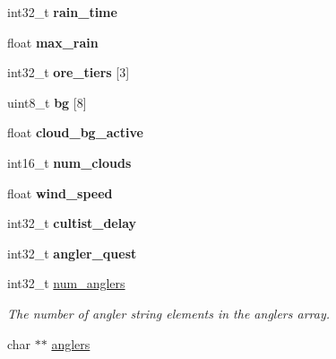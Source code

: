 \begin{DoxyCompactItemize}
\item 
\hypertarget{structworld_abf5197fc16933a702ef5f93432dfee52}{}int32\+\_\+t {\bfseries rain\+\_\+time}\label{structworld_abf5197fc16933a702ef5f93432dfee52}

\item 
\hypertarget{structworld_a7b007e79302363a07a14e06af7a60214}{}float {\bfseries max\+\_\+rain}\label{structworld_a7b007e79302363a07a14e06af7a60214}

\item 
\hypertarget{structworld_a496df8ba461d79de3c5f1aabd089844a}{}int32\+\_\+t {\bfseries ore\+\_\+tiers} \mbox{[}3\mbox{]}\label{structworld_a496df8ba461d79de3c5f1aabd089844a}

\item 
\hypertarget{structworld_a464553c413709cbf6936a36a3452199f}{}uint8\+\_\+t {\bfseries bg} \mbox{[}8\mbox{]}\label{structworld_a464553c413709cbf6936a36a3452199f}

\item 
\hypertarget{structworld_a028e822e40eb84c09d9afabb98de4007}{}float {\bfseries cloud\+\_\+bg\+\_\+active}\label{structworld_a028e822e40eb84c09d9afabb98de4007}

\item 
\hypertarget{structworld_ab53fb29e9273dcd4a3150811a5d43767}{}int16\+\_\+t {\bfseries num\+\_\+clouds}\label{structworld_ab53fb29e9273dcd4a3150811a5d43767}

\item 
\hypertarget{structworld_a5f1b61cb4b6baadfcc80ec0423be8f08}{}float {\bfseries wind\+\_\+speed}\label{structworld_a5f1b61cb4b6baadfcc80ec0423be8f08}

\item 
\hypertarget{structworld_aa33ce2ce0954ae1aff6cb887103db2ac}{}int32\+\_\+t {\bfseries cultist\+\_\+delay}\label{structworld_aa33ce2ce0954ae1aff6cb887103db2ac}

\item 
\hypertarget{structworld_ae1620b6a8837272d706d1302b004dad1}{}int32\+\_\+t {\bfseries angler\+\_\+quest}\label{structworld_ae1620b6a8837272d706d1302b004dad1}

\item 
\hypertarget{structworld_a47df9b52c97b07873d7df3335105b66d}{}int32\+\_\+t \hyperlink{structworld_a47df9b52c97b07873d7df3335105b66d}{num\+\_\+anglers}\label{structworld_a47df9b52c97b07873d7df3335105b66d}

\begin{DoxyCompactList}\small\item\em The number of angler string elements in the anglers array. \end{DoxyCompactList}\item 
\hypertarget{structworld_a0078d4cc9cbeba90f6f32ffecd7ff306}{}char $\ast$$\ast$ \hyperlink{structworld_a0078d4cc9cbeba90f6f32ffecd7ff306}{anglers}\label{structworld_a0078d4cc9cbeba90f6f32ffecd7ff306}


\end{DoxyCompactItemize}
